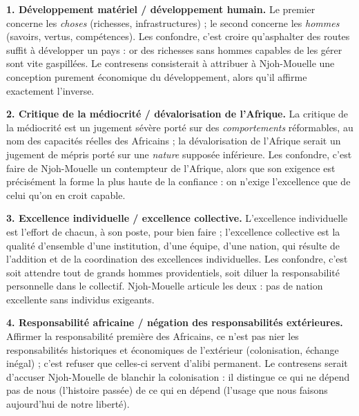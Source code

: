 \documentclass[11pt]{article}
\begin{document}
\begin{corrige}

\textbf{1. Développement matériel / développement humain.} Le premier concerne les \emph{choses} (richesses, infrastructures) ; le second concerne les \emph{hommes} (savoirs, vertus, compétences). Les confondre, c'est croire qu'asphalter des routes suffit à développer un pays : or des richesses sans hommes capables de les gérer sont vite gaspillées. Le contresens consisterait à attribuer à Njoh-Mouelle une conception purement économique du développement, alors qu'il affirme exactement l'inverse.

\textbf{2. Critique de la médiocrité / dévalorisation de l'Afrique.} La critique de la médiocrité est un jugement sévère porté sur des \emph{comportements} réformables, au nom des capacités réelles des Africains ; la dévalorisation de l'Afrique serait un jugement de mépris porté sur une \emph{nature} supposée inférieure. Les confondre, c'est faire de Njoh-Mouelle un contempteur de l'Afrique, alors que son exigence est précisément la forme la plus haute de la confiance : on n'exige l'excellence que de celui qu'on en croit capable.

\textbf{3. Excellence individuelle / excellence collective.} L'excellence individuelle est l'effort de chacun, à son poste, pour bien faire ; l'excellence collective est la qualité d'ensemble d'une institution, d'une équipe, d'une nation, qui résulte de l'addition et de la coordination des excellences individuelles. Les confondre, c'est soit attendre tout de \guillemotleft grands hommes \guillemotright providentiels, soit diluer la responsabilité personnelle dans le collectif. Njoh-Mouelle articule les deux : pas de nation excellente sans individus exigeants.

\textbf{4. Responsabilité africaine / négation des responsabilités extérieures.} Affirmer la responsabilité première des Africains, ce n'est pas nier les responsabilités historiques et économiques de l'extérieur (colonisation, échange inégal) ; c'est refuser que celles-ci servent d'alibi permanent. Le contresens serait d'accuser Njoh-Mouelle de \guillemotleft blanchir \guillemotright la colonisation : il distingue ce qui ne dépend pas de nous (l'histoire passée) de ce qui en dépend (l'usage que nous faisons aujourd'hui de notre liberté).
\end{corrige}
\end{document}

